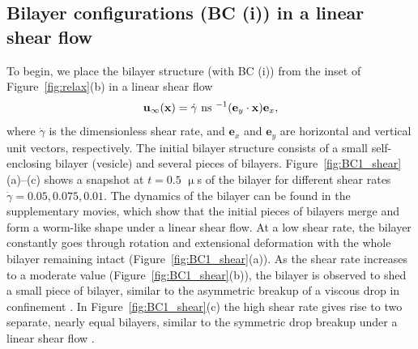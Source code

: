 \documentclass[prb,preprint,showpacs,preprintnumbers,amsmath,amssymb,longbibliography]{revtex4-1}
\newcommand{\ee}{\mathbf{e}}
\newcommand{\xx}{\mathbf{x}}
\newcommand{\uu}{\mathbf{u}}
\begin{document}
\subsection{Bilayer configurations (BC (i)) in a linear shear flow}
To begin, we place the bilayer structure (with BC (i)) from the inset of
Figure~\ref{fig:relax}(b) in a linear shear flow
\begin{equation}
\uu_\infty(\xx) = \dot\gamma \text{ ns }^{-1} ({\bf e}_y \cdot \mathbf{x}) {\bf e}_x,
\end{equation}
%
where $\dot\gamma$ is the dimensionless shear rate, and ${\ee}_x$ and
${\ee}_y$ are horizontal and vertical unit vectors, respectively. The
initial bilayer structure consists of a small self-enclosing bilayer
(vesicle) and several pieces of bilayers.
Figure~\ref{fig:BC1_shear}(a)--(c) shows a snapshot at $t = 0.5$
$\upmu$s of the bilayer for different shear rates $\dot\gamma=
0.05,0.075,0.01$. The dynamics of the bilayer can be found in the
supplementary movies, which show that the initial pieces of bilayers
merge and form a worm-like shape under a linear shear flow. At a low
shear rate, the bilayer constantly goes through rotation and extensional
deformation with the whole bilayer remaining intact
(Figure~\ref{fig:BC1_shear}(a)). As the shear rate increases to a
moderate value (Figure~\ref{fig:BC1_shear}(b)), the bilayer is observed
to shed a small piece of bilayer, similar to the asymmetric breakup of a
viscous drop in confinement \cite{DuFuZhuMaLi2016_AICHEJ}.
In Figure~\ref{fig:BC1_shear}(c) the high shear rate gives rise to two
separate, nearly equal bilayers, similar to the symmetric drop breakup
under a linear shear flow \cite{Stone1994_ARFM}. 
\end{document}
